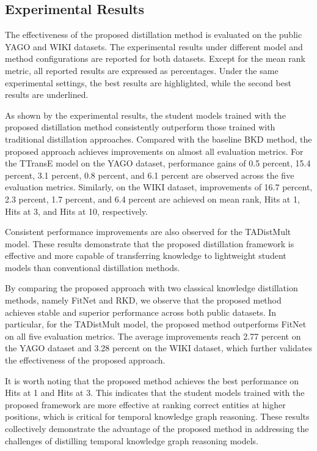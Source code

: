 \documentclass[11pt]{article}
\begin{document}
\subsection{Experimental Results}

The effectiveness of the proposed distillation method is evaluated on the public YAGO and WIKI datasets. The experimental results under different model and method configurations are reported for both datasets. Except for the mean rank metric, all reported results are expressed as percentages. Under the same experimental settings, the best results are highlighted, while the second best results are underlined.

As shown by the experimental results, the student models trained with the proposed distillation method consistently outperform those trained with traditional distillation approaches. Compared with the baseline BKD method, the proposed approach achieves improvements on almost all evaluation metrics. For the TTransE model on the YAGO dataset, performance gains of 0.5 percent, 15.4 percent, 3.1 percent, 0.8 percent, and 6.1 percent are observed across the five evaluation metrics. Similarly, on the WIKI dataset, improvements of 16.7 percent, 2.3 percent, 1.7 percent, and 6.4 percent are achieved on mean rank, Hits at 1, Hits at 3, and Hits at 10, respectively.

Consistent performance improvements are also observed for the TADistMult model. These results demonstrate that the proposed distillation framework is effective and more capable of transferring knowledge to lightweight student models than conventional distillation methods.

By comparing the proposed approach with two classical knowledge distillation methods, namely FitNet and RKD, we observe that the proposed method achieves stable and superior performance across both public datasets. In particular, for the TADistMult model, the proposed method outperforms FitNet on all five evaluation metrics. The average improvements reach 2.77 percent on the YAGO dataset and 3.28 percent on the WIKI dataset, which further validates the effectiveness of the proposed approach.

It is worth noting that the proposed method achieves the best performance on Hits at 1 and Hits at 3. This indicates that the student models trained with the proposed framework are more effective at ranking correct entities at higher positions, which is critical for temporal knowledge graph reasoning. These results collectively demonstrate the advantage of the proposed method in addressing the challenges of distilling temporal knowledge graph reasoning models.
\end{document}

